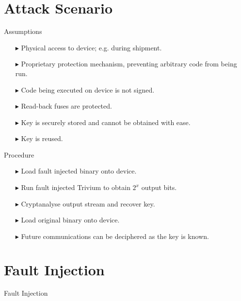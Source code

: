 \documentclass[10pt, compress]{beamer}
\begin{document}
\section{Attack Scenario}

\begin{frame}{Assumptions}
\begin{itemize}[itemsep=0.5cm]
\item[$\blacktriangleright$] Physical access to device; e.g. during shipment.
\item[$\blacktriangleright$] Proprietary protection mechanism, preventing arbitrary code from being run.
\item[$\blacktriangleright$] Code being executed on device is not signed.
\item[$\blacktriangleright$] Read-back fuses are protected.
\item[$\blacktriangleright$] Key is securely stored and cannot be obtained with ease.
\item[$\blacktriangleright$] Key is reused.
\end{itemize}
\end{frame}

\begin{frame}{Procedure}
\begin{itemize}[itemsep=0.5cm]
\item[$\blacktriangleright$] Load fault injected binary onto device.
\item[$\blacktriangleright$] Run fault injected Trivium to obtain $2^x$ output bits.
\item[$\blacktriangleright$] Cryptanalyse output stream and recover key.
\item[$\blacktriangleright$] Load original binary onto device.
\item[$\blacktriangleright$] Future communications can be deciphered as the key is known.
\end{itemize}
\end{frame}

\section{Fault Injection}

\begin{frame}{Fault Injection}
\begin{figure}

\end{figure}
\end{frame}
\end{document}

